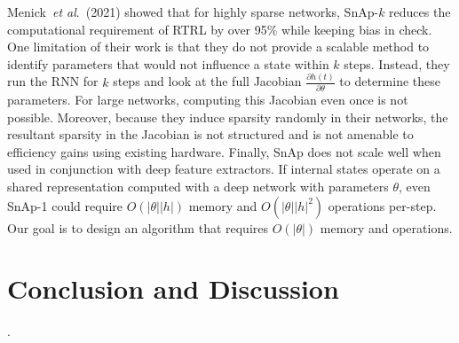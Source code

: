 \documentclass{article}
\newcommand{\etal}{\textit{et al}.}
\begin{document}
 Menick~\etal~(2021) showed that for highly sparse networks, SnAp-$k$ reduces the computational requirement of RTRL by over 95\% while keeping bias in check. One limitation of their work is that they do not provide a scalable method to identify parameters that would not influence a state within $k$ steps. Instead, they run the RNN for $k$ steps and look at the full Jacobian $\frac{\partial h(t)}{\partial \theta}$ to determine these parameters. For large networks, computing this Jacobian even once is not possible. Moreover, because they induce sparsity randomly in their networks, the resultant sparsity in the Jacobian is not structured and is not amenable to efficiency gains using existing hardware. Finally, SnAp does not scale well when used in conjunction with deep feature extractors. If internal states operate on a shared representation computed with a deep network with parameters $\theta$, even SnAp-1 could require $O(|\theta||h|)$ memory and $O(|\theta||h|^2)$ operations per-step. Our goal is to design an algorithm that requires $O(|\theta|)$ memory and operations.







\section{Conclusion and Discussion} 

 

\nocite{sutton1992adapting}
\nocite{finn2017model}
\nocite{kingma2014adam}
\nocite{rumelhart1986learning}
\nocite{werbos1974beyond}
\nocite{werbos1988generalization}
\nocite{li2017meta}
\nocite{javed2019meta}
\nocite{bengio2019meta}
\nocite{williams1989learning}
\nocite{robinson1987utility}
\nocite{vivek}
\nocite{hochreiter1997long}
\nocite{menick2020practical}
\nocite{tallec2017unbiased}
\nocite{cooijmans2019variance}
\nocite{sutskever2013training}
\nocite{elman1990finding}
\nocite{mikolov2009neural}
\nocite{mikolov2010recurrent}
\nocite{ollivier2015training}
\nocite{bengio1990learning}
\nocite{cho2014learning}
\nocite{glorot2010understanding}
\nocite{mujika2018approximating}
\nocite{williams1990efficient}
\nocite{kapturowski2018recurrent}
\nocite{pllr}
\nocite{schmidhuber1987evolutionary}. 
\nocite{glorot2011deep}
\nocite{Tange2011a}





\onecolumn 
\appendix

\end{document}
